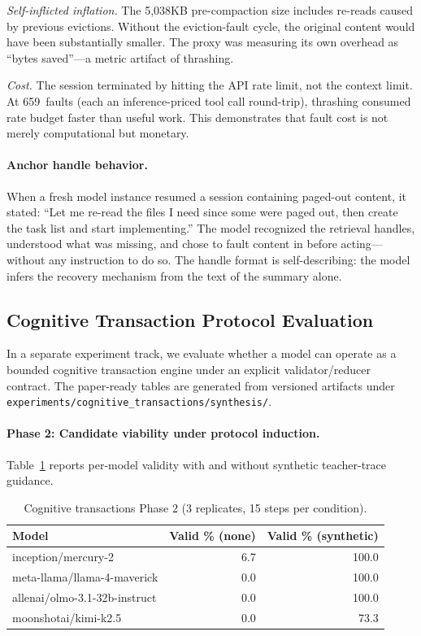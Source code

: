 \emph{Self-inflicted inflation.} The 5{,}038KB pre-compaction size
includes re-reads caused by previous evictions. Without the
eviction-fault cycle, the original content would have been
substantially smaller. The proxy was measuring its own overhead as
``bytes saved''---a metric artifact of thrashing.

\emph{Cost.} The session terminated by hitting the API rate limit,
not the context limit. At 659~faults (each an inference-priced tool
call round-trip), thrashing consumed rate budget faster than useful
work. This demonstrates that fault cost is not merely computational
but monetary.

\paragraph{Anchor handle behavior.}
When a fresh model instance resumed a session containing paged-out
content, it stated: ``Let me re-read the files I need since some
were paged out, then create the task list and start implementing.''
The model recognized the retrieval handles, understood what was
missing, and chose to fault content in before acting---without any
instruction to do so. The handle format is self-describing: the
model infers the recovery mechanism from the text of the summary
alone.


\subsection{Cognitive Transaction Protocol Evaluation}
\label{sec:cognitive-transactions}

In a separate experiment track, we evaluate whether a model can operate
as a bounded cognitive transaction engine under an explicit
validator/reducer contract. The paper-ready tables are generated from
versioned artifacts under
\texttt{experiments/cognitive\_transactions/synthesis/}.

\paragraph{Phase 2: Candidate viability under protocol induction.}
Table~\ref{tab:ct-phase2} reports per-model validity with and without
synthetic teacher-trace guidance.

\begin{table}[ht]
\centering
\caption{Cognitive transactions Phase 2 (3 replicates, 15 steps per condition).}
\label{tab:ct-phase2}
\small
\begin{tabular}{@{}lrr@{}}
\toprule
\textbf{Model} & \textbf{Valid \% (none)} & \textbf{Valid \% (synthetic)} \\
\midrule
inception/mercury-2 & 6.7 & 100.0 \\
meta-llama/llama-4-maverick & 0.0 & 100.0 \\
allenai/olmo-3.1-32b-instruct & 0.0 & 100.0 \\
moonshotai/kimi-k2.5 & 0.0 & 73.3 \\
\bottomrule
\end{tabular}
\end{table}

